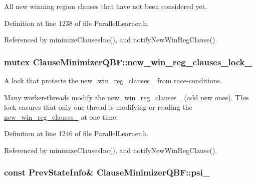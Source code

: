 All new winning region clauses that have not been considered yet. 



Definition at line 1238 of file Parallel\-Learner.\-h.



Referenced by minimize\-Clauses\-Inc(), and notify\-New\-Win\-Reg\-Clause().

\hypertarget{classClauseMinimizerQBF_aa59e412c42a4f160c6ed1d85d7c4612d}{
\subsubsection[{new\-\_\-win\-\_\-reg\-\_\-clauses\-\_\-lock\-\_\-}]{\setlength{\rightskip}{0pt plus 5cm}mutex Clause\-Minimizer\-Q\-B\-F\-::new\-\_\-win\-\_\-reg\-\_\-clauses\-\_\-lock\-\_\-\hspace{0.3cm}{\ttfamily [protected]}}}\label{classClauseMinimizerQBF_aa59e412c42a4f160c6ed1d85d7c4612d}


A lock that protects the \hyperlink{classClauseMinimizerQBF_abe2ed21eb5d92ef978ad6aa83ed8af7e}{new\-\_\-win\-\_\-reg\-\_\-clauses\-\_\-} from race-\/conditions. 

Many worker-\/threads modify the \hyperlink{classClauseMinimizerQBF_abe2ed21eb5d92ef978ad6aa83ed8af7e}{new\-\_\-win\-\_\-reg\-\_\-clauses\-\_\-} (add new ones). This lock ensures that only one thread is modifying or reading the \hyperlink{classClauseMinimizerQBF_abe2ed21eb5d92ef978ad6aa83ed8af7e}{new\-\_\-win\-\_\-reg\-\_\-clauses\-\_\-} at one time. 

Definition at line 1246 of file Parallel\-Learner.\-h.



Referenced by minimize\-Clauses\-Inc(), and notify\-New\-Win\-Reg\-Clause().

\hypertarget{classClauseMinimizerQBF_a3423321ecad44cf8b1c9b5f5afb17d27}{
\subsubsection[{psi\-\_\-}]{\setlength{\rightskip}{0pt plus 5cm}const {\bf Prev\-State\-Info}\& Clause\-Minimizer\-Q\-B\-F\-::psi\-\_\-\hspace{0.3cm}{\ttfamily [protected]}}}\label{classClauseMinimizerQBF_a3423321ecad44cf8b1c9b5f5afb17d27}



